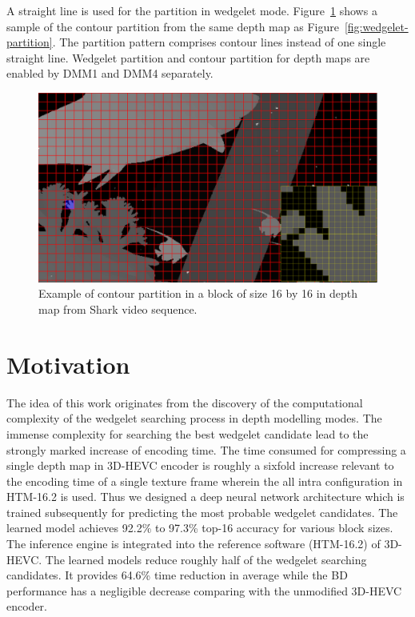 A straight line is used for the partition in wedgelet mode.
Figure~\ref{fig:contour-partition} shows a sample of the contour partition
from the same depth map as Figure~\ref{fig:wedgelet-partition}.
The partition pattern comprises contour lines instead of one single
straight line.
Wedgelet partition and contour partition for depth maps
are enabled by DMM1 and DMM4 separately.
\begin{figure}
    \centering
    \includegraphics[width=\textwidth,height=\textheight,keepaspectratio]{Figures/contour}
    \caption[Contour partition illustration]
    {Example of contour partition in a block of size 16 by 16 in depth map
    from Shark video sequence.
    }
    \label{fig:contour-partition}
\end{figure}


\section{Motivation}\label{sec:motivation_and_contribution}
The idea of this work originates from the discovery of the computational
complexity of the wedgelet searching process in depth modelling modes.
The immense complexity for searching the best wedgelet candidate lead to
the strongly marked increase of encoding time.
The time consumed for compressing a single depth map in 3D-HEVC encoder is
roughly a sixfold increase relevant to the encoding time of a single texture
frame wherein the all intra configuration in HTM-16.2 is used.
Thus we designed a deep neural network architecture which is trained
subsequently for predicting the most probable wedgelet candidates.
The learned model achieves 92.2\% to 97.3\% top-16 accuracy for various
block sizes.
The inference engine is integrated into the reference software
(HTM-16.2) of 3D-HEVC.
The learned models reduce roughly half of the wedgelet searching candidates.
It provides 64.6\% time reduction in average while the BD performance
has a negligible decrease comparing with the unmodified 3D-HEVC encoder.

